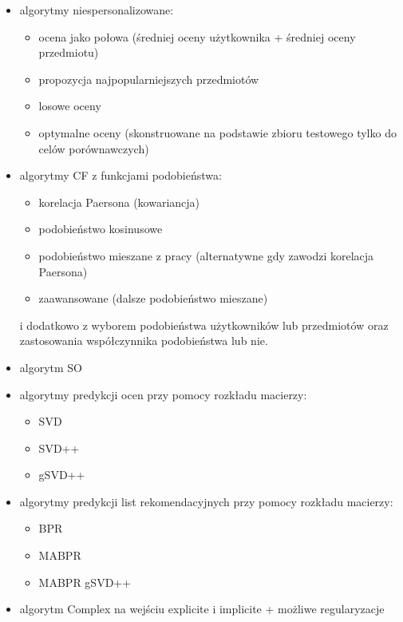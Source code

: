 \documentclass{pracamgr}
\begin{document}
   \begin{itemize}\itemsep1pt \parskip0pt 
    \item algorytmy niespersonalizowane:
     \begin{itemize}\itemsep1pt \parskip0pt 
      \item ocena jako połowa (średniej oceny użytkownika + średniej oceny przedmiotu)
      \item propozycja najpopularniejszych przedmiotów
      \item losowe oceny
      \item optymalne oceny (skonstruowane na podstawie zbioru testowego tylko do celów porównawczych)
     \end{itemize}
    \item algorytmy CF z funkcjami podobieństwa:
     \begin{itemize}\itemsep1pt \parskip0pt 
      \item korelacja Paersona (kowariancja)
      \item podobieństwo kosinusowe
      \item podobieństwo mieszane z pracy \cite{221} (alternatywne gdy zawodzi korelacja Paersona)
      \item zaawansowane (dalsze podobieństwo mieszane)
     \end{itemize}
     i dodatkowo z wyborem podobieństwa użytkowników lub przedmiotów oraz zastosowania współczynnika podobieństwa lub nie.
    \item algorytm SO
    \item algorytmy predykcji ocen przy pomocy rozkładu macierzy:
     \begin{itemize}\itemsep1pt \parskip0pt 
      \item SVD
      \item SVD++
      \item gSVD++
     \end{itemize}
    \item algorytmy predykcji list rekomendacyjnych przy pomocy rozkładu macierzy:
     \begin{itemize}\itemsep1pt \parskip0pt 
      \item BPR
      \item MABPR
      \item MABPR gSVD++
     \end{itemize}   
    \item algorytm Complex na wejściu explicite i implicite + możliwe regularyzacje
   \end{itemize}\newpage
\end{document}
